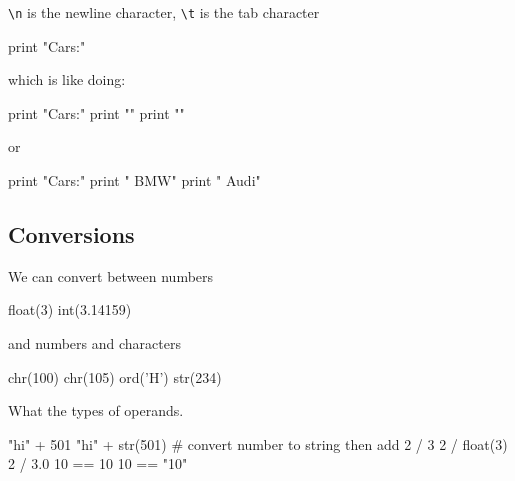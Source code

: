 \documentclass[titlepage]{tufte-book}
\begin{document}
\begin{fullwidth}
{\tt \textbackslash n}  is the newline character, {\tt \textbackslash t}  is the tab character


\begin{pyconsole}[f]
print "Cars:\n\tBMW\n\tAudi"
\end{pyconsole}

which is like doing:
 
\begin{pyconsole}[g]
print "Cars:"
print "\tBMW"
print "\tAudi"
\end{pyconsole}

or

\begin{pyconsole}[h]
print "Cars:"
print "	BMW"
print "	Audi"
\end{pyconsole}


\subsection{Conversions}

We can convert between numbers

\begin{pyconsole}[i]
float(3)
int(3.14159)
\end{pyconsole}

\noindent and numbers and characters

\begin{pyconsole}[j]
chr(100)
chr(105)
ord('H')
str(234)
\end{pyconsole}

What the types of operands.

\begin{pyconsole}[j]
"hi" + 501
"hi" + str(501)   # convert number to string then add
2 / 3
2 / float(3)
2 / 3.0
10 == 10
10 == "10"
\end{pyconsole}

\end{fullwidth}
\end{document}
